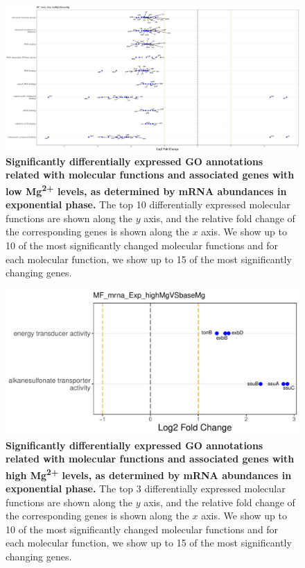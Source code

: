 \documentclass[a4paper]{article}
\begin{document}
\begin{figure}[!htb]
	\includegraphics[width=1.0\textwidth]{../../d_figures/MF09_mrna_Exp_lowMgVSbaseMg_withTitle.pdf}
	\caption[Significantly differentially expressed GO annotations associated with molecular functions for mRNA samples in exponential phase tested for low Mg\textsuperscript{2+} levels against base Mg\textsuperscript{2+} levels]
	{\textbf{Significantly differentially expressed GO annotations related with molecular functions and associated genes with low Mg\textsuperscript{2+} levels, as determined by mRNA abundances in exponential phase.} The top 10 differentially expressed molecular functions are shown along the $y$ axis, and the relative fold change of the corresponding genes is shown along the $x$ axis. We show up to 10 of the most significantly changed molecular functions and for each molecular function, we show up to 15 of the most significantly changing genes.}
\end{figure}

\begin{figure}[!htb]
	\includegraphics[width=1.0\textwidth]{../../d_figures/MF10_mrna_Exp_highMgVSbaseMg_withTitle.pdf}
	\caption[Significantly differentially expressed GO annotations associated with molecular functions for mRNA samples in exponential phase tested for high Mg\textsuperscript{2+} levels against base Mg\textsuperscript{2+} levels]
	{\textbf{Significantly differentially expressed GO annotations related with molecular functions and associated genes with high Mg\textsuperscript{2+} levels, as determined by mRNA abundances in exponential phase.} The top 3 differentially expressed molecular functions are shown along the $y$ axis, and the relative fold change of the corresponding genes is shown along the $x$ axis. We show up to 10 of the most significantly changed molecular functions and for each molecular function, we show up to 15 of the most significantly changing genes.}
\end{figure}
\end{document}
